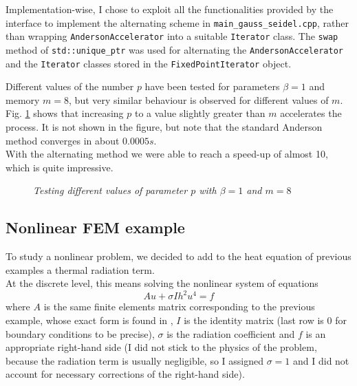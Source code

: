 \documentclass[12pt]{article}
\begin{document}
			Implementation-wise, I chose to exploit all the functionalities provided by the interface
			to implement the alternating scheme in	\verb|main_gauss_seidel.cpp|, rather than
			wrapping \verb|AndersonAccelerator| into a suitable \verb|Iterator| class. 
			The \verb|swap| method of \verb|std::unique_ptr| was used for alternating the \verb|AndersonAccelerator|
			and the \verb|Iterator| classes stored in the \verb|FixedPointIterator| object.
			
			Different values of the number $p$ have been tested for parameters $\beta=1$ and memory $m=8$, but very similar behaviour
			is observed for different values of $m$. Fig. \ref{fig:tab1} shows that increasing $p$ to a value slightly greater than
			$m$ accelerates the process. It is not shown in the figure, but note that the standard Anderson method converges in
			about $0.0005 s$.\\
			With the alternating method we were able to reach a speed-up of almost 10, which is quite impressive.
			
			
			\begin{figure}
			{\scriptsize
			}
			\centering
			\caption{\textit{Testing different values of parameter $p$ with $\beta=1$ and $m=8$}}
			\label{fig:tab1}
			\end{figure}
			
			
			
			\subsection{Nonlinear FEM example}
			To study a nonlinear problem, we decided to add to the heat equation of previous examples a thermal radiation term.\\
			At the discrete level, this means solving the nonlinear system of equations
			\begin{equation}
				\label{eq:non}
				A u + \sigma I h^2 u^4 = f
			\end{equation}
			where $A$ is the same finite elements matrix corresponding to the previous example, whose exact form is found in
			\cite{Formaggia}, $I$ is the identity matrix (last row is 0 for boundary conditions to be precise), $\sigma$ is the radiation coefficient and $f$ is an
			appropriate right-hand side (I did not stick to the physics of the problem, because the radiation term
			is usually negligible, so I assigned $\sigma=1$ and I did not account for necessary corrections of the right-hand
			side).
			
\end{document}

